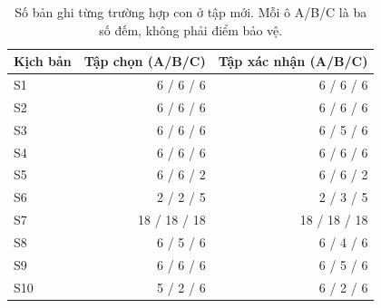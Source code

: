 \begin{table}[htbp]
\centering\small
\caption{Số bản ghi từng trường hợp con ở tập mới. Mỗi ô A/B/C là ba số đếm, không phải điểm bảo vệ.}
\label{tab:fresh-dataset}
\begin{tabular}{lrr}
\toprule
Kịch bản & Tập chọn (A/B/C) & Tập xác nhận (A/B/C) \\
\midrule
S1 & 6 / 6 / 6 & 6 / 6 / 6 \\
S2 & 6 / 6 / 6 & 6 / 6 / 6 \\
S3 & 6 / 6 / 6 & 6 / 5 / 6 \\
S4 & 6 / 6 / 6 & 6 / 6 / 6 \\
S5 & 6 / 6 / 2 & 6 / 6 / 2 \\
S6 & 2 / 2 / 5 & 2 / 3 / 5 \\
S7 & 18 / 18 / 18 & 18 / 18 / 18 \\
S8 & 6 / 5 / 6 & 6 / 4 / 6 \\
S9 & 6 / 6 / 6 & 6 / 5 / 6 \\
S10 & 5 / 2 / 6 & 6 / 2 / 6 \\
\bottomrule
\end{tabular}
\end{table}
